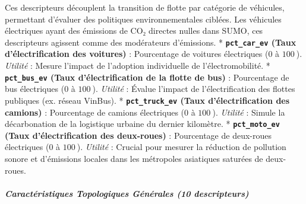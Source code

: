 \documentclass[10pt, a4paper]{article}
\begin{document}
Ces descripteurs découplent la transition de flotte par catégorie de
véhicules, permettant d'évaluer des politiques environnementales
ciblées. Les véhicules électriques ayant des émissions de CO₂ directes
nulles dans SUMO, ces descripteurs agissent comme des modérateurs
d'émissions. * \textbf{\texttt{pct\_car\_ev} (Taux d'électrification des
voitures)} : Pourcentage de voitures électriques (\(0\) à \(100\ %
\)). \emph{Utilité} : Mesure l'impact de l'adoption individuelle de
l'électromobilité. * \textbf{\texttt{pct\_bus\_ev} (Taux
d'électrification de la flotte de bus)} : Pourcentage de bus électriques
(\(0\) à \(100\ %
\)). \emph{Utilité} : Évalue l'impact de l'électrification des flottes
publiques (ex. réseau VinBus). * \textbf{\texttt{pct\_truck\_ev} (Taux
d'électrification des camions)} : Pourcentage de camions électriques
(\(0\) à \(100\ %
\)). \emph{Utilité} : Simule la décarbonation de la logistique urbaine
du dernier kilomètre. * \textbf{\texttt{pct\_moto\_ev} (Taux
d'électrification des deux-roues)} : Pourcentage de deux-roues
électriques (\(0\) à \(100\ %
\)). \emph{Utilité} : Crucial pour mesurer la réduction de pollution
sonore et d'émissions locales dans les métropoles asiatiques saturées de
deux-roues.

\subparagraph{Caractéristiques Topologiques Générales (10
descripteurs)}\label{caractuxe9ristiques-topologiques-guxe9nuxe9rales-10-descripteurs}
\end{document}
